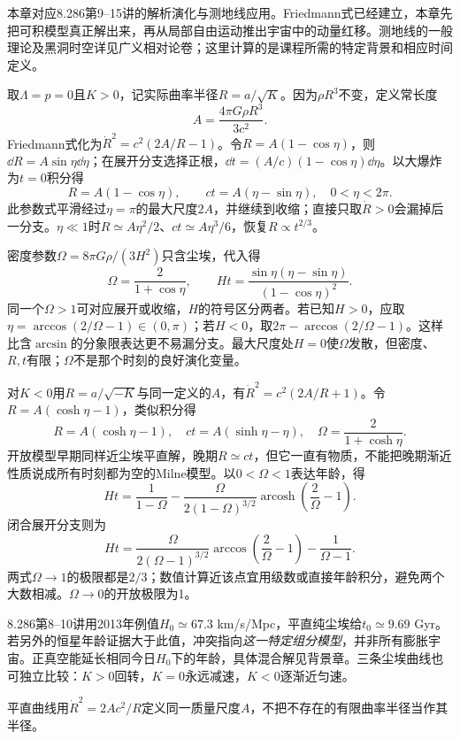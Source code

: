 本章对应8.286第9--15讲的解析演化与测地线应用。Friedmann式已经建立，本章先把可积模型真正解出来，再从局部自由运动推出宇宙中的动量红移。测地线的一般理论及黑洞时空详见广义相对论卷；这里计算的是课程所需的特定背景和相应时间定义。

取$\Lambda=p=0$且$K>0$，记实际曲率半径$R=a/\sqrt K$。因为$\rho R^3$不变，定义常长度
\[
 A=\frac{4\pi G\rho R^3}{3c^2}.
\]
Friedmann式化为$\dot R^2=c^2(2A/R-1)$。令$R=A(1-\cos\eta)$，则$\dd R=A\sin\eta\dd\eta$；在展开分支选择正根，$\dd t=(A/c)(1-\cos\eta)\dd\eta$。以大爆炸为$t=0$积分得
\[
 R=A(1-\cos\eta),\qquad ct=A(\eta-\sin\eta),\quad0<\eta<2\pi.
\]
此参数式平滑经过$\eta=\pi$的最大尺度$2A$，并继续到收缩；直接只取$\dot R>0$会漏掉后一分支。$\eta\ll1$时$R\simeq A\eta^2/2$、$ct\simeq A\eta^3/6$，恢复$R\propto t^{2/3}$。

密度参数$\Omega=8\pi G\rho/(3H^2)$只含尘埃，代入得
\[
 \Omega=\frac2{1+\cos\eta},\qquad
 Ht=\frac{\sin\eta(\eta-\sin\eta)}{(1-\cos\eta)^2}.
\]
同一个$\Omega>1$可对应展开或收缩，$H$的符号区分两者。若已知$H>0$，应取$\eta=\arccos(2/\Omega-1)\in(0,\pi)$；若$H<0$，取$2\pi-\arccos(2/\Omega-1)$。这样比含$\arcsin$的分象限表达更不易漏分支。最大尺度处$H=0$使$\Omega$发散，但密度、$R,t$有限；$\Omega$不是那个时刻的良好演化变量。

对$K<0$用$R=a/\sqrt{-K}$与同一定义的$A$，有$\dot R^2=c^2(2A/R+1)$。令$R=A(\cosh\eta-1)$，类似积分得
\[
 R=A(\cosh\eta-1),\quad ct=A(\sinh\eta-\eta),\quad
 \Omega=\frac2{1+\cosh\eta}.
\]
开放模型早期同样近尘埃平直解，晚期$R\simeq ct$，但它一直有物质，不能把晚期渐近性质说成所有时刻都为空的Milne模型。以$0<\Omega<1$表达年龄，得
\[
 Ht=\frac1{1-\Omega}-\frac{\Omega}{2(1-\Omega)^{3/2}}
 \operatorname{arcosh}\left(\frac2\Omega-1\right).
\]
闭合展开分支则为
\[
 Ht=\frac{\Omega}{2(\Omega-1)^{3/2}}
 \arccos\left(\frac2\Omega-1\right)-\frac1{\Omega-1}.
\]
两式$\Omega\to1$的极限都是$2/3$；数值计算近该点宜用级数或直接年龄积分，避免两个大数相减。$\Omega\to0$的开放极限为1。

8.286第8--10讲用2013年例值$H_0\simeq67.3$ km/s/Mpc，平直纯尘埃给$t_0\simeq9.69$ Gyr。若另外的恒星年龄证据大于此值，冲突指向\emph{这一特定组分模型}，并非所有膨胀宇宙。正真空能延长相同今日$H_0$下的年龄，具体混合解见背景章。三条尘埃曲线也可独立比较：$K>0$回转，$K=0$永远减速，$K<0$逐渐近匀速。

\begin{center}\end{center}
平直曲线用$\dot R^2=2Ac^2/R$定义同一质量尺度$A$，不把不存在的有限曲率半径当作其半径。

